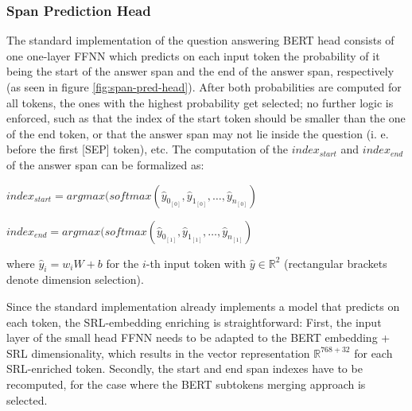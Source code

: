 
\subsubsection{Span Prediction Head}

The standard implementation of the question answering BERT head consists of one one-layer FFNN which predicts
on each input token the probability of it being the start of the answer span and the end of the
answer span, respectively (as seen in figure \ref{fig:span-pred-head}). After both probabilities are computed for all tokens, the ones with
the highest probability get selected; no further logic is enforced, such as that the index of
the start token should be smaller than the one of the end token, or that the answer span may
not lie inside the question (i. e. before the first [SEP] token), etc. The computation of the
$index_{start}$ and $index_{end}$ of the answer span can be formalized as:

$index_{start} = argmax(softmax(\hat{y}_{0_{[0]}}, \hat{y}_{1_{[0]}}, \dotso , \hat{y}_{n_{[0]}})$

$index_{end} = argmax(softmax(\hat{y}_{0_{[1]}}, \hat{y}_{1_{[1]}}, \dotso , \hat{y}_{n_{[1]}})$

where $\hat{y}_i = w_iW+b$ for the $i$-th input token with $\hat{y} \in \mathbb{R}^2$ (rectangular brackets denote dimension selection).

Since the standard implementation already implements a model that predicts on each token,
the SRL-embedding enriching is straightforward:
First, the input layer of the small head FFNN needs to be adapted to the BERT embedding + SRL
dimensionality, which results in the vector representation $\mathbb{R}^{768+32}$ for each
SRL-enriched token. Secondly, the start and end span indexes have to be recomputed, for the case
where the BERT subtokens merging approach is selected.


